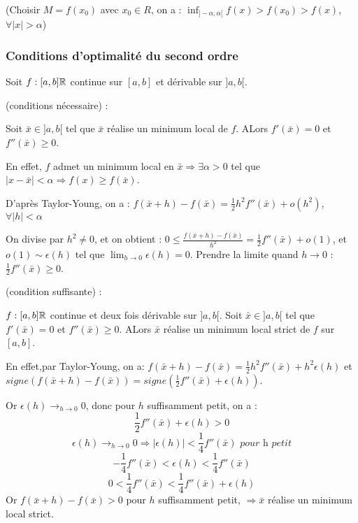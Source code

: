 		(Choisir $M = f(x_0)$ avec $x_0 \in R$, on a : $\inf_{]-\alpha, \alpha[} f(x) > f(x_0) > f(x)$, $\forall |x| > \alpha$)
		
		\subsubsection{Conditions d'optimalité du second ordre}
		
		Soit $f : [a, b] \mathbb{R}$ continue sur $[a, b]$ et dérivable sur $]a, b[$.
		
		\begin{theoreme} (conditions nécessaire) : 
		
		Soit $\bar{x} \in ]a, b[$ tel que $\bar{x}$ réalise un minimum local de $f$. ALors $f'(\bar{x}) = 0$ et $f''(\bar{x}) \geq 0$.
		\end{theoreme}
		
		En effet, $f$ admet un minimum local en $\bar{x} \Rightarrow \exists \alpha >0$ tel que $|x-\bar{x}|<\alpha \Rightarrow f(x) \geq f(\bar{x})$.
		
		D'après Taylor-Young, on a : $\displaystyle f(\bar{x}+h) -f(\bar{x}) = \frac{1}{2} h^2 f''(\bar{x}) + o(h^2)$, $\forall |h|<\alpha$
		
		On divise par $h^2 \ne 0$, et on obtient : $\displaystyle 0 \leq \frac{f(\bar{x}+h) - f(\bar{x}) }{ h^2 } = \frac{1}{2} f''(\bar{x}) + o(1) $, et $o(1) \sim \epsilon(h)$ tel que $\lim_{h \rightarrow 0} \epsilon(h) = 0$.
		Prendre la limite quand $h\rightarrow 0$ : $\frac{1}{2} f''(\bar{x}) \geq 0$.
		
		\begin{theoreme} (condition suffisante) :
		
		$f : [a, b] \mathbb{R}$ continue et deux fois dérivable sur $]a, b[$. Soit $\bar{x} \in ]a, b[$ tel que $f'(\bar{x}) = 0$ et $f''(\bar{x}) \geq 0$. ALors $\bar{x}$ réalise un minimum local strict de $f$ sur $[a, b]$.
		\end{theoreme}
		
		En effet,par Taylor-Young, on a: $f(\bar{x}+h) -f(\bar{x}) = \frac{1}{2} h^2 f''(\bar{x}) + h^2 \epsilon(h)$ et $signe( f(\bar{x}+h) - f(\bar{x}) ) = signe( \frac{1}{2} f''(\bar{x}) + \epsilon(h))$.
		
		Or $\displaystyle \epsilon(h) \longrightarrow_{h\rightarrow 0} 0$, donc pour $h$ suffisamment petit, on a : 
		\[ \frac{1}{2} f''(\bar{x}) + \epsilon(h) >0\]
		\[ \epsilon(h) \longrightarrow_{h\rightarrow 0} 0 \Rightarrow |\epsilon(h)| < \frac{1}{4} f''(\bar{x}) \textit{ pour h petit}\]
		\[-\frac{1}{4} f''(\bar{x}) < \epsilon(h) < \frac{1}{4} f''(\bar{x})\]
		\[0< \frac{1}{4} f''(\bar{x}) < \frac{1}{4} f''(\bar{x}) + \epsilon(h) \]
		Or $f(\bar{x}+h) - f(\bar{x}) >0$ pour $h$ suffisamment petit, $ \Rightarrow \bar{x}$ réalise un minimum local strict.
		
